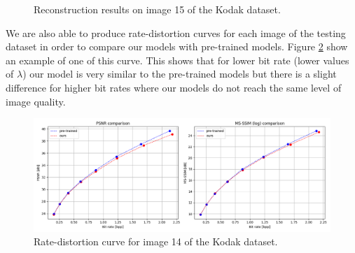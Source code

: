 \begin{figure}[H]
    \centering
    \caption{Reconstruction results on image 15 of the Kodak dataset.}
    \label{bdpsnr_2}
\end{figure}

We are also able to produce rate-distortion curves for each image of the testing dataset in order to compare our models with pre-trained models. Figure \ref{bdpsnr_3} show an example of one of this curve. This shows that for lower bit rate (lower values of \(\lambda\)) our model is very similar to the pre-trained models but there is a slight difference for higher bit rates where our models do not reach the same level of image quality.

\begin{figure}
    \centering
    \includegraphics[width=15cm]{img/balle_bdpsnr_3.png}
    \caption{Rate-distortion curve for image 14 of the Kodak dataset.}
    \label{bdpsnr_3}
\end{figure}

